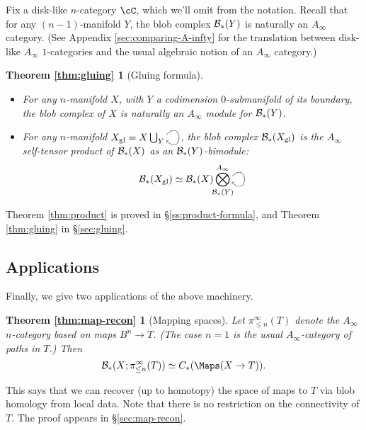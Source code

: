 Fix a disk-like $n$-category $\cC$, which we'll omit from the notation.
Recall that for any $(n-1)$-manifold $Y$, the blob complex ${\mathcal B}_*(Y)$ is naturally an $A_\infty$ category.
(See Appendix \ref{sec:comparing-A-infty} for the translation between disk-like $A_\infty$ $1$-categories and the usual algebraic notion of an $A_\infty$ category.)

\newtheorem*{thm:gluing}{Theorem \ref{thm:gluing}}

\begin{thm:gluing}[Gluing formula]
\mbox{}%
\begin{itemize}
\item For any $n$-manifold $X$, with $Y$ a codimension $0$-submanifold of its boundary, the blob complex of $X$ is naturally an
$A_\infty$ module for ${\mathcal B}_*(Y)$.

\item For any $n$-manifold $X_\text{gl} = X\bigcup_Y \selfarrow$, the blob complex ${\mathcal B}_*(X_\text{gl})$ is the $A_\infty$ self-tensor product of
${\mathcal B}_*(X)$ as an ${\mathcal B}_*(Y)$-bimodule:
\begin{equation*}
\bc_*(X_\text{gl}) \simeq \bc_*(X) \Tensor^{A_\infty}_{\mathclap{\bc_*(Y)}} \selfarrow
\end{equation*}
\end{itemize}
\end{thm:gluing}

Theorem \ref{thm:product} is proved in \S \ref{ss:product-formula}, and Theorem \ref{thm:gluing} in \S \ref{sec:gluing}.

\subsection{Applications}
\label{sec:applications}
Finally, we give two applications of the above machinery.

\newtheorem*{thm:map-recon}{Theorem \ref{thm:map-recon}}

\begin{thm:map-recon}[Mapping spaces]
Let $\pi^\infty_{\le n}(T)$ denote the $A_\infty$ $n$-category based on maps 
$B^n \to T$.
(The case $n=1$ is the usual $A_\infty$-category of paths in $T$.)
Then 
$$\bc_*(X; \pi^\infty_{\le n}(T)) \simeq \CM{X}{T}.$$
\end{thm:map-recon}

This says that we can recover (up to homotopy) the space of maps to $T$ via blob homology from local data. 
Note that there is no restriction on the connectivity of $T$.
The proof appears in \S \ref{sec:map-recon}.

